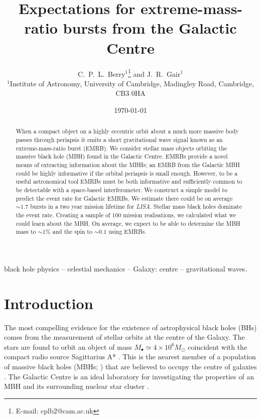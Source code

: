 \documentclass[useAMS,usedcolumn,usegraphicx,usenatbib]{mn2e}
\title[Expectations for EMRBs from the GC]{Expectations for extreme-mass-ratio bursts from the Galactic Centre}
\author[C.\ P.\ L.\ Berry and J.\ R.\ Gair]{C.\ P.\ L.\ Berry$^{1}$\thanks{E-mail:
cplb2@cam.ac.uk}  and J.\ R.\ Gair$^{1}$\\
$^{1}$Institute of Astronomy, University of Cambridge, Madingley Road, Cambridge, CB3 0HA}
\begin{document}
\date{\today}

\pagerange{\pageref{firstpage}--\pageref{lastpage}} 

\maketitle

\label{firstpage}

\begin{abstract}
When a compact object on a highly eccentric orbit about a much more massive body passes through periapsis it emits a short gravitational wave signal known as an extreme-mass-ratio burst (EMRB). We consider stellar mass objects orbiting the massive black hole (MBH) found in the Galactic Centre. EMRBs provide a novel means of extracting information about the MBHs; an EMRB from the Galactic MBH could be highly informative if the orbital periapsis is small enough. However, to be a useful astronomical tool EMRBs must be both informative and sufficiently common to be detectable with a space-based interferometer. We construct a simple model to predict the event rate for Galactic EMRBs. We estimate there could be on average $\sim 1.7$ bursts in a two year mission lifetime for {\textit{LISA}}. Stellar mass black holes dominate the event rate. Creating a sample of $100$ mission realisations, we calculated what we could learn about the MBH. On average, we expect to be able to determine the MBH mass to $\sim1\%$ and the spin to $\sim0.1$ using EMRBs.
\end{abstract}

\begin{keywords}
black hole physics -- celestial mechanics -- Galaxy: centre -- gravitational waves.
\end{keywords}

\section{Introduction}

The most compelling evidence for the existence of astrophysical black holes (BHs) comes from the measurement of stellar orbits at the centre of the Galaxy. The stars are found to orbit an object of mass $M_\bullet \simeq 4 \times 10^6 M_\odot$ coincident with the compact radio source Sagittarius A* \citep{Reid2004, Ghez2008, Gillessen2009, Meyer2012}. This is the nearest member of a population of massive black holes (MBHs; \citealt{Volonteri2010}) that are believed to occupy the centre of galaxies \citep{Lynden-Bell1969, Rees1984, Ferrarese2005}. The Galactic Centre is an ideal laboratory for investigating the properties of an MBH and its surrounding nuclear star cluster \citep{Genzel2010}.
\end{document}
